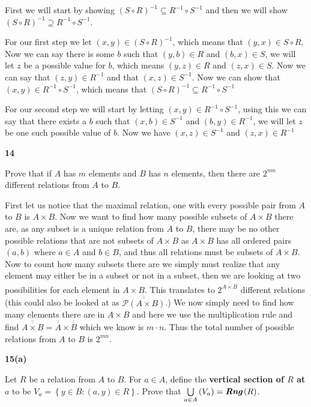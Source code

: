 \documentclass{article}
\newcommand{\sectionheading}[1]{\noindent\textbf{#1}

}
\let\bigunion\bigcup
\let\composed\circ
\let\cross\times
\newcommand{\unionfrom}[3]{\bigunion\limits_{#1}^{#2} \left( {#3} \right)}
\newcommand{\unionacross}[2]{\unionfrom{#1}{}{#2}}
\newcommand{\set}[1]{\left\{ {#1} \right\}}
\newcommand{\setbuilder}[2]{\set{#1 : #2}}
\newcommand{\cardinality}[1]{\overline{\overline{#1}}}
\newcommand{\range}[1]{\textit{\textbf{Rng}}\left( #1 \right)}
\newcommand{\pset}[1]{\mathscr P\left( #1 \right)}
\begin{document}
First we will start by showing $(S\composed R)^{-1} \subseteq R^{-1}\composed S^{-1}$ and then we will show $(S\composed R)^{-1} \supseteq R^{-1}\composed S^{-1}$.

For our first step we let $(x,y) \in (S \composed R)^{-1}$, which means that $(y,x)\in S\composed R$. Now we can say there is some $b$ such that $(y,b) \in R$ and $(b,x) \in S$, we will let $z$ be a possible value for $b$, which means $(y,z) \in R$ and $(z,x) \in S$. Now we can say that $(z,y) \in R^{-1}$ and that $(x,z) \in S^{-1}$. Now we can show that $(x,y)\in R^{-1}\composed S^{-1}$, which means that $(S\composed R)^{-1} \subseteq R^{-1}\composed S^{-1}$

For our second step we will start by letting $(x,y) \in R^{-1}\composed S^{-1}$, using this we can say that there exists a $b$ such that $(x,b)\in S^{-1}$ and $(b,y)\in R^{-1}$, we will let $z$ be one such possible value of $b$. Now we have $(x,z)\in S^{-1}$ and $(z,x) \in R^{-1}$ 

\bigskip
\sectionheading{14}
Prove that if $A$ has $m$ elements and $B$ has $n$ elements, then there are $2^{mn}$ different relations from $A$ to $B$. 

\smallskip

First let us notice that the maximal relation, one with every possible pair from $A$ to $B$ is $A \cross B$. Now we want to find how many possible subsets of $A\cross B$ there are, as any subset is a unique relation from $A$ to $B$, there may be no other possible relations that are not subsets of $A\cross B$ as $A\cross B$ has all ordered pairs $(a,b)$ where $a\in A$ and $b \in B$, and thus all relations must be subsets of $A\cross B$. Now to count how many subsets there are we simply must realize that any element may either be in a subset or not in a subset, then we are looking at two possibilities for each element in $A\cross B$. This translates to $2^{\cardinality{A\cross B}}$ different relations (this could also be looked at as $\cardinality{\pset{A\cross B}}$.) We now simply need to find how many elements there are in $A\cross B$ and here we use the multiplication rule and find $\cardinality{A\cross B} = \cardinality{A}\times\cardinality{B}$ which we know is $m\cdot n$. Thus the total number of possible relations from $A$ to $B$ is $2^{mn}$.

\bigskip
\sectionheading{15(a)}
Let $R$ be a relation from $A$ to $B$. For $a \in A$, define the \textbf{vertical section of $R$ at $a$} to be $V_a=\setbuilder{y\in B}{(a,y)\in R}$. Prove that $\unionacross{a\in A}{V_a}=\range{R}$.
\end{document}
